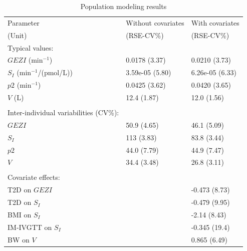 \documentclass[utf8]{frontiersSCNS} %
\begin{document}
\begin{table}[h]
\caption{Population modeling results}
\label{tab:prm estimates}
\begin{tabular}{lll}
\hline
Parameter   & Without covariates & With covariates \\
(Unit)    & (RSE-CV\%) & (RSE-CV\%)\\ 
\hline
Typical values: \\
\hspace{.2cm} $GEZI$ (min$^{-1}$)                  & 0.0178 (3.37) & 0.0210 (3.73) \\
\hspace{.2cm} $S_I$ (min$^{-1}$/(pmol/L)) & 3.59e-05 (5.80)                          & 6.26e-05 (6.33)                        \\
\hspace{.2cm} $p2$ (min$^{-1}$)                    & 0.0425 (3.62) & 0.0420 (3.65) \\
\hspace{.2cm} $V$ (L)                         & 12.4 (1.87)   & 12.0 (1.56)   \\
                              &               &               \\
Inter-individual variabilities (CV\%): \\
\hspace{.2cm} $GEZI$                      & 50.9 (4.65)   & 46.1 (5.09)   \\
\hspace{.2cm} $S_I$                        & 113 (3.83)    & 83.8 (3.44)   \\
\hspace{.2cm} $p2$                        & 44.0 (7.79)   & 44.9 (7.47)   \\
\hspace{.2cm} $V$                         & 34.4 (3.48)   & 26.8 (3.11)   \\
                              &               &               \\
Covariate effects: &               &               \\
\hspace{.2cm} T2D on $GEZI$                  &               & -0.473 (8.73) \\
\hspace{.2cm} T2D on $S_I$                     &               & -0.479 (9.95) \\
\hspace{.2cm} BMI on $S_I$                     &               & -2.14 (8.43)  \\
\hspace{.2cm} IM-IVGTT on $S_I$                       &               & -0.345 (19.4)  \\ 
\hspace{.2cm} BW on $V$                       &               & 0.865 (6.49)  \\ 


\end{tabular}
\end{table}
\end{document}
